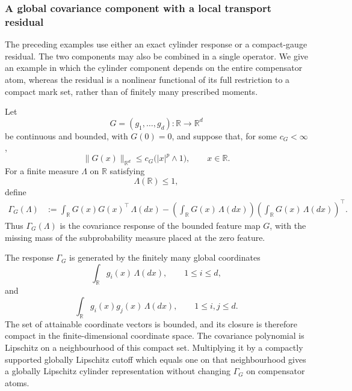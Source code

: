 \documentclass[a4paper,10pt]{article}
\begin{document}
\subsubsection{A global covariance component with a local transport
residual}

The preceding examples use either an exact cylinder response or a
compact-gauge residual. The two components may also be combined in a
single operator. We give an example in which the cylinder component
depends on the entire compensator atom, whereas the residual is a
nonlinear functional of its full restriction to a compact mark set,
rather than of finitely many prescribed moments.

Let
\[
        G=(g_1,\ldots,g_d):
        \mathbb R\longrightarrow\mathbb R^d
\]
be continuous and bounded, with \(G(0)=0\), and suppose that, for some
\(c_G<\infty\),
\[
        \lVert G(x)\rVert_{\mathbb R^d}
        \le
        c_G\bigl(|x|^p\wedge1\bigr),
        \qquad x\in\mathbb R.
\]
For a finite measure \(\Lambda\) on \(\mathbb R\) satisfying
\[
        \Lambda(\mathbb R)\le1,
\]
define
\[
\begin{aligned}
\Gamma_G(\Lambda)
&:=
\int_{\mathbb R}
G(x)G(x)^\top\,\Lambda(dx)
-
\left(
\int_{\mathbb R}G(x)\,\Lambda(dx)
\right)
\left(
\int_{\mathbb R}G(x)\,\Lambda(dx)
\right)^\top.
\end{aligned}
\]
Thus \(\Gamma_G(\Lambda)\) is the covariance response of the bounded
feature map \(G\), with the missing mass of the subprobability measure
placed at the zero feature.

The response \(\Gamma_G\) is generated by the finitely many global
coordinates
\[
        \int_{\mathbb R}g_i(x)\,\Lambda(dx),
        \qquad 1\le i\le d,
\]
and
\[
        \int_{\mathbb R}g_i(x)g_j(x)\,\Lambda(dx),
        \qquad 1\le i,j\le d.
\]
The set of attainable coordinate vectors is bounded, and its closure
is therefore compact in the finite-dimensional coordinate space. The
covariance polynomial is Lipschitz on a neighbourhood of this compact
set. Multiplying it by a compactly supported globally Lipschitz cutoff
which equals one on that neighbourhood gives a globally Lipschitz
cylinder representation without changing \(\Gamma_G\) on compensator
atoms.
\end{document}
